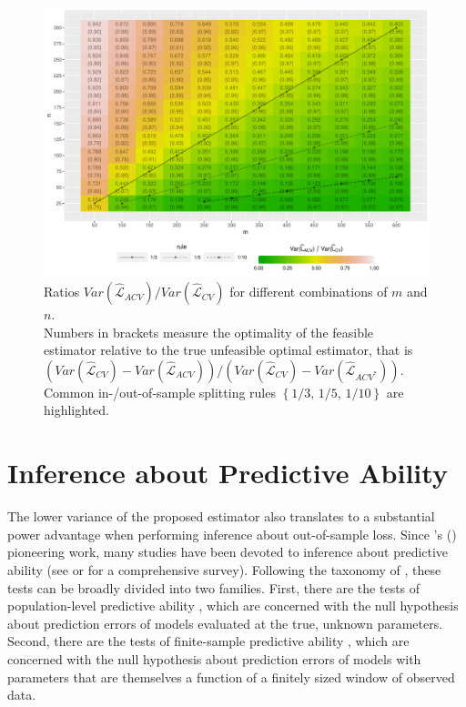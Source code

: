 \documentclass[11pt,dvipsnames]{article}
\newcommand{\possessivecite}[1]{\citeauthor{#1}'s (\citeyear{#1})}
\begin{document}
\begin{figure}[!htbp]
\centering
  \includegraphics[width=.90\linewidth]{../../Scripts/VarianceRatio/Outputs/VarianceRatio_Article.pdf}
  \caption{
  Ratios $ Var(\widehat{\mathcal{L}}_{ACV})/Var(\widehat{\mathcal{L}}_{CV})$ for different combinations of $ m $ and $ n $.\\
  Numbers in brackets measure the optimality of the feasible estimator relative to the true unfeasible optimal estimator, that is $(Var(\widehat{\mathcal{L}}_{CV})-Var(\widehat{\mathcal{L}}_{ACV}))/(Var(\widehat{\mathcal{L}}_{CV})-Var(\widehat{\mathcal{L}}_{ACV^{*}}) )$. Common in-/out-of-sample splitting rules $ \left\lbrace 1/3,\,1/5,\,1/10 \right\rbrace  $ are highlighted. 
 }
  \label{fig:VarianceRatio}
\end{figure}

\section{Inference about Predictive Ability}\label{TestingFiniteSamplePredictiveAbility}

The lower variance of the proposed estimator also translates to a substantial power advantage when performing inference about out-of-sample loss. Since \possessivecite{dieboldComparingPredictiveAccuracy1995} pioneering work, many studies have been devoted to inference about predictive ability (see \citet{westChapterForecastEvaluation2006} or  \citet{clarkChapter20Advances2013} for a comprehensive survey). Following the taxonomy of \citet{clarkChapter20Advances2013}, these tests can be broadly divided into two families. First, there are the tests of population-level predictive ability \citep[e.g.][]{westAsymptoticInferencePredictive1996,clarkTestsEqualForecast2001}, which are concerned with the null hypothesis about prediction errors of models evaluated at the true, unknown parameters. Second, there are the tests of finite-sample predictive ability \citep[e.g.][]{giacominiTestsConditionalPredictive2006,clarkNestedForecastModel2015}, which are concerned with the null hypothesis about prediction errors of models with parameters that are themselves a function of a finitely sized window of observed data. 
\end{document}
